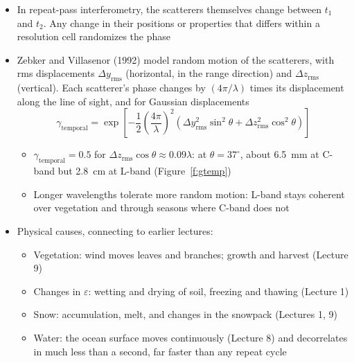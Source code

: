 \documentclass[11pt, oneside]{article}
\begin{document}
\begin{itemize}
	\item In repeat-pass interferometry, the scatterers themselves change between $t_1$ and $t_2$. Any change in their positions or properties that differs within a resolution cell randomizes the phase
	\item Zebker and Villasenor (1992) model random motion of the scatterers, with rms displacements $\Delta y_\mathrm{rms}$ (horizontal, in the range direction) and $\Delta z_\mathrm{rms}$ (vertical). Each scatterer's phase changes by $(4\pi/\lambda)$ times its displacement along the line of sight, and for Gaussian displacements
	\begin{equation}
		\label{e:gtemp}
		\gamma_\mathrm{temporal} = \exp\left[-\frac12\left(\frac{4\pi}{\lambda}\right)^2\left(\Delta y_\mathrm{rms}^2\sin^2\theta + \Delta z_\mathrm{rms}^2\cos^2\theta\right)\right]
	\end{equation}
	\begin{itemize}
		\item $\gamma_\mathrm{temporal} = 0.5$ for $\Delta z_\mathrm{rms}\cos\theta \approx 0.09\lambda$: at $\theta = 37^\circ$, about 6.5~mm at C-band but 2.8~cm at L-band (Figure~\ref{f:gtemp})
		\item[$\Rightarrow$] Longer wavelengths tolerate more random motion: L-band stays coherent over vegetation and through seasons where C-band does not
	\end{itemize}
	\item Physical causes, connecting to earlier lectures:
	\begin{itemize}
		\item Vegetation: wind moves leaves and branches; growth and harvest (Lecture 9)
		\item Changes in $\varepsilon$: wetting and drying of soil, freezing and thawing (Lecture 1)
		\item Snow: accumulation, melt, and changes in the snowpack (Lectures 1, 9)
		\item Water: the ocean surface moves continuously (Lecture 8) and decorrelates in much less than a second, far faster than any repeat cycle

\end{itemize}
\end{itemize}
\end{document}
